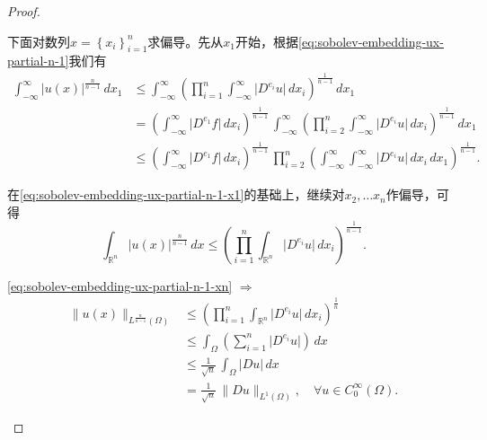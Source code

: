 \begin{proof}
\begin{enumerate}
下面对数列$x = \left\{ x_i \right\}_{i=1}^{n}$求偏导。先从$x_1$开始，根据\eqref{eq:sobolev-embedding-ux-partial-n-1}我们有
\begin{equation}
  \label{eq:sobolev-embedding-ux-partial-n-1-x1}
  \begin{split}
    \int_{-\infty}^{\infty}  \big| u(x) \big|^{\frac{n}{n-1}} \, d x_1
    & \le \int_{-\infty}^{\infty}
    \left(
    \prod_{i=1}^{n} \int_{-\infty}^{\infty} \big| D^{e_i} u \big| \, d x_i
    \right)^{\frac{1}{n-1}}
    \, dx_1 \\
    & = \left(
    \int_{-\infty}^{\infty} \big| D^{e_1} f \big| \, d x_i
    \right)^{\frac{1}{n-1}} \,
    \int_{-\infty}^{\infty}
    \left(
    \prod_{i=2}^{n} \int_{-\infty}^{\infty} \big| D^{e_i} u \big| \, d x_i
    \right)^{\frac{1}{n-1}}
    \, dx_1 \\
    & \le \left(
    \int_{-\infty}^{\infty} \big| D^{e_1} f \big| \, d x_i
    \right)^{\frac{1}{n-1}} \,
    \prod_{i=2}^{n}
    \left(
     \int_{-\infty}^{\infty} \int_{-\infty}^{\infty} \big| D^{e_i} u \big| \, d x_i \, dx_1
    \right)^{\frac{1}{n-1}}.
  \end{split}
\end{equation}

在\eqref{eq:sobolev-embedding-ux-partial-n-1-x1}的基础上，继续对$x_2,\ldots x_n$作偏导，可得
\begin{equation}
  \label{eq:sobolev-embedding-ux-partial-n-1-xn}
  \int_{\mathbb{R}^n} \big| u(x) \big|^{\frac{n}{n-1}} \, d x
  \le \left(
  \prod_{i=1}^{n} \int_{\mathbb{R}^n} \big| D^{e_i} u \big| \, d x_i
  \right)^{\frac{1}{n-1}}.
\end{equation}

\eqref{eq:sobolev-embedding-ux-partial-n-1-xn} $\Rightarrow$
\begin{equation*}
\label{eq:sobolev-embedding-ux-partial-n-1-xn-p1}
  \begin{split}
    \big\| u(x) \big\|_{L^{\frac{n}{n-1}}(\Omega)} & \le \left(
    \prod_{i=1}^{n} \int_{\mathbb{R}^n} \big| D^{e_i} u \big| \, d x_i
    \right)^{\frac{1}{n}} \\
    &\le \int_{\Omega} \left( \sum_{i=1}^{n} \big|
    D^{e_i} u
    \big| \right) \, dx \\
    & \le \frac{1}{\sqrt{n}} \, \int_{\Omega} \big| D u \big| \, dx \\
    & = \frac{1}{\sqrt{n}} \, \big\| D u\big\|_{L^{1}(\Omega)}, \quad \forall u \in C_0^{\infty}(\Omega).
  \end{split}
\end{equation*}


\end{enumerate}
\end{proof}
